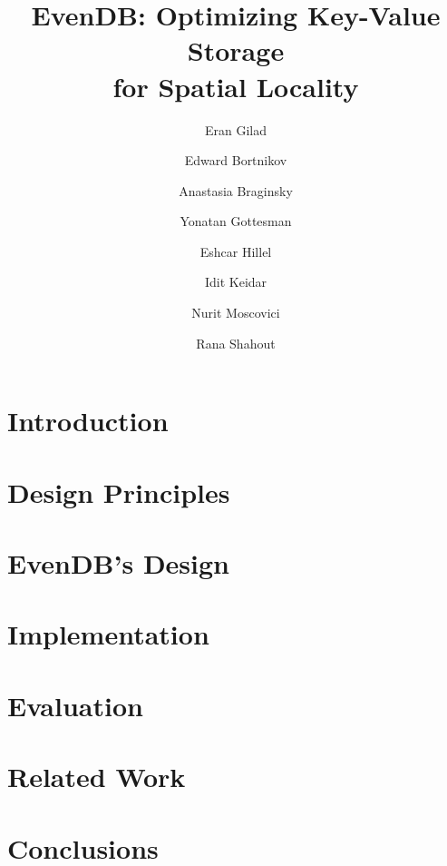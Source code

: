 \documentclass[sigplan,10pt]{acmart}
\date{}
\newcommand{\sys}{EvenDB}
\begin{document}
\title[\sys: Key-Value Storage for Spatial Locality]{\sys: Optimizing Key-Value Storage\\ for Spatial Locality} 

\author{Eran Gilad}


\author{Edward Bortnikov}

\author{Anastasia Braginsky}


\author{Yonatan Gottesman}


\author{Eshcar Hillel}

\author{Idit Keidar}

\author{Nurit Moscovici}

\author{Rana Shahout}

\begin{abstract}

\end{abstract}

\maketitle

\section{Introduction}
\label{sec:intro}


\section{Design Principles}
\label{sec:principles}

\section{\sys's Design}
\label{sec:design}


\section{Implementation}
\label{sec:impl}


\section{Evaluation}
\label{sec:eval}


\section{Related Work}
\label{sec:related}


\section{Conclusions}
\label{sec:conclusions}




\clearpage


\end{document}
